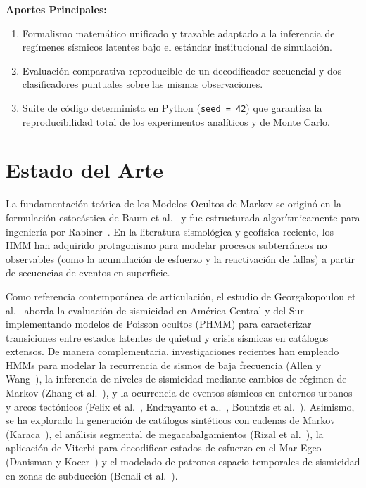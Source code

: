 \documentclass[11pt,a4paper]{article}
\begin{document}
\textbf{Aportes Principales:}
\begin{enumerate}
    \item Formalismo matemático unificado y trazable adaptado a la inferencia de regímenes sísmicos latentes bajo el estándar institucional de simulación.
    \item Evaluación comparativa reproducible de un decodificador secuencial y dos clasificadores puntuales sobre las mismas observaciones.
    \item Suite de código determinista en Python (\texttt{seed = 42}) que garantiza la reproducibilidad total de los experimentos analíticos y de Monte Carlo.
\end{enumerate}

\section{Estado del Arte}

La fundamentación teórica de los Modelos Ocultos de Markov se originó en la formulación estocástica de Baum et al.~\cite{baum1970maximization} y fue estructurada algorítmicamente para ingeniería por Rabiner~\cite{rabiner1989tutorial}. En la literatura sismológica y geofísica reciente, los HMM han adquirido protagonismo para modelar procesos subterráneos no observables (como la acumulación de esfuerzo y la reactivación de fallas) a partir de secuencias de eventos en superficie. 

Como referencia contemporánea de articulación, el estudio de Georgakopoulou et al.~\cite{georgakopoulou2024seismic} aborda la evaluación de sismicidad en América Central y del Sur implementando modelos de Poisson ocultos (PHMM) para caracterizar transiciones entre estados latentes de quietud y crisis sísmicas en catálogos extensos. De manera complementaria, investigaciones recientes han empleado HMMs para modelar la recurrencia de sismos de baja frecuencia (Allen y Wang~\cite{allen2023hidden}), la inferencia de niveles de sismicidad mediante cambios de régimen de Markov (Zhang et al.~\cite{zhang2023statistical}), y la ocurrencia de eventos sísmicos en entornos urbanos y arcos tectónicos (Felix et al.~\cite{felix2022poisson}, Endrayanto et al.~\cite{endrayanto2026markov}, Bountzis et al.~\cite{bountzis2022pseudo}). Asimismo, se ha explorado la generación de catálogos sintéticos con cadenas de Markov (Karaca~\cite{karaca2021generation}), el análisis segmental de megacabalgamientos (Rizal et al.~\cite{rizal2023seismic}), la aplicación de Viterbi para decodificar estados de esfuerzo en el Mar Egeo (Danisman y Kocer~\cite{danisman2021fitting}) y el modelado de patrones espacio-temporales de sismicidad en zonas de subducción (Benali et al.~\cite{benali2020modelling}).
\end{document}

